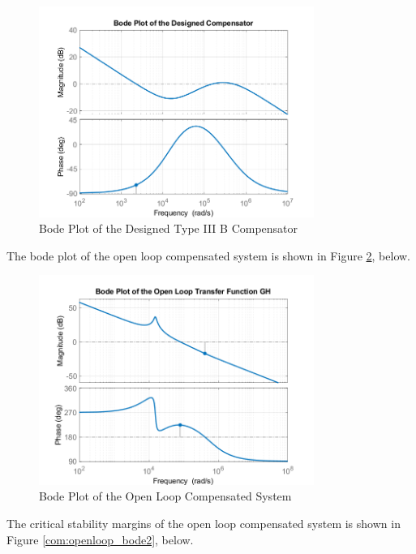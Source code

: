 \begin{figure}[H]
\begin{center}
\includegraphics[width=0.8\textwidth]{bode_plots/comp_bode.png}
\caption{Bode Plot of the Designed Type III B Compensator}
\label{com:comp_bode}
\end{center}
\end{figure}

The bode plot of the open loop compensated system is shown in Figure \ref{com:openloop_bode1}, below.

\begin{figure}[H]
\begin{center}
\includegraphics[width=0.8\textwidth]{bode_plots/OpenLoop_bode1.png}
\caption{Bode Plot of the Open Loop Compensated System}
\label{com:openloop_bode1}
\end{center}
\end{figure}

The critical stability margins of the open loop compensated system is shown in Figure \ref{com:openloop_bode2}, below.


